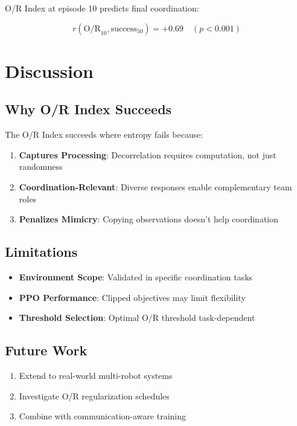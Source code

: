 \documentclass[twoside]{article}
\newcommand{\ORIndex}{O/R Index}
\begin{document}
\ORIndex{} at episode 10 predicts final coordination:

\begin{equation}
r(\text{O/R}_{10}, \text{success}_{50}) = +0.69 \quad (p < 0.001)
\end{equation}

\section{Discussion}

\subsection{Why O/R Index Succeeds}

The \ORIndex{} succeeds where entropy fails because:

\begin{enumerate}
    \item \textbf{Captures Processing}: Decorrelation requires computation, not just randomness
    \item \textbf{Coordination-Relevant}: Diverse responses enable complementary team roles
    \item \textbf{Penalizes Mimicry}: Copying observations doesn't help coordination
\end{enumerate}

\subsection{Limitations}

\begin{itemize}
    \item \textbf{Environment Scope}: Validated in specific coordination tasks
    \item \textbf{PPO Performance}: Clipped objectives may limit flexibility
    \item \textbf{Threshold Selection}: Optimal O/R threshold task-dependent
\end{itemize}

\subsection{Future Work}

\begin{enumerate}
    \item Extend to real-world multi-robot systems
    \item Investigate O/R regularization schedules
    \item Combine with communication-aware training
\end{enumerate}
\end{document}
